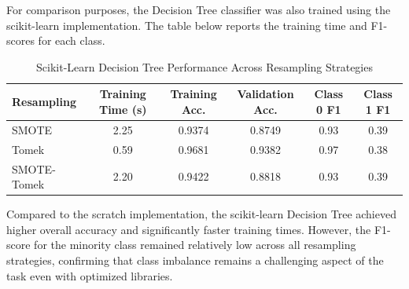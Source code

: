 For comparison purposes, the Decision Tree classifier was also trained using the scikit-learn implementation. 
The table below reports the training time and F1-scores for each class.

\begin{table}[H]
\centering
\caption{Scikit-Learn Decision Tree Performance Across Resampling Strategies}
\label{tab:dt_sklearn_results}
\begin{tabular}{|l|c|c|c|c|c|}
\hline
\textbf{Resampling} & \textbf{Training Time (s)} & \textbf{Training Acc.} & \textbf{Validation Acc.} & \textbf{Class 0 F1} & \textbf{Class 1 F1} \\ \hline
SMOTE & 2.25 & 0.9374 & 0.8749 & 0.93 & 0.39 \\ \hline
Tomek & 0.59 & 0.9681 & 0.9382 & 0.97 & 0.38 \\ \hline
SMOTE-Tomek & 2.20 & 0.9422 & 0.8818 & 0.93 & 0.39 \\ \hline
\end{tabular}
\end{table}

Compared to the scratch implementation, the scikit-learn Decision Tree achieved higher overall accuracy and significantly faster training times. 
However, the F1-score for the minority class remained relatively low across all resampling strategies, confirming that class imbalance remains a challenging aspect of the task even with optimized libraries.





